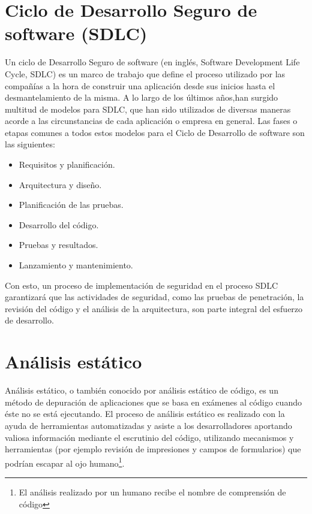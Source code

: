 \section{Ciclo de Desarrollo Seguro de software (\gls{SDLC})}

Un ciclo de Desarrollo Seguro de software (en inglés, Software Development Life Cycle, \gls{SDLC}) es un marco de trabajo que define el proceso utilizado por las compañías a la hora de construir una aplicación desde sus inicios hasta el desmantelamiento de la misma. A lo largo de los últimos años,han surgido multitud de modelos para \gls{SDLC}, que han sido utilizados de diversas maneras acorde a las circunstancias de cada aplicación o empresa en general. Las fases o etapas comunes a todos estos modelos para el Ciclo de Desarrollo de software son las siguientes:

\begin{itemize}
	\item Requisitos y planificación.
	\item Arquitectura y diseño.
	\item Planificación de las pruebas.
	\item Desarrollo del código.
	\item Pruebas y resultados.
	\item Lanzamiento y mantenimiento.
\end{itemize}

Con esto, un proceso de implementación de seguridad en el proceso \gls{SDLC} garantizará que las actividades de seguridad, como las pruebas de penetración, la revisión del código y el análisis de la arquitectura, son parte integral del esfuerzo de desarrollo.

\section{Análisis estático}

Análisis estático, o también conocido por análisis estático de código, es un método de depuración de aplicaciones que se basa en exámenes al código cuando éste no se está ejecutando. El proceso de análisis estático es realizado con la ayuda de herramientas automatizadas y asiste a los desarrolladores aportando valiosa información mediante el escrutinio del código, utilizando mecanismos y herramientas (por ejemplo revisión de impresiones y campos de formularios) que podrían escapar al ojo humano\footnote{El análisis realizado por un humano recibe el nombre de comprensión de código}\cite{rouse2017}.

